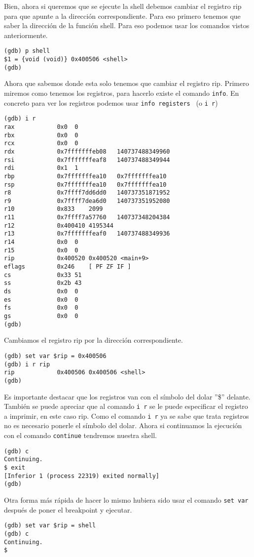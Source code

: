 Bien, ahora si queremos que se ejecute la shell debemos cambiar el registro rip para que apunte a la dirección correspondiente. Para eso primero tenemos que saber la dirección de la función shell. Para eso podemos usar los comandos vistos anteriormente.
\begin{verbatim}
(gdb) p shell
$1 = {void (void)} 0x400506 <shell>
(gdb)
\end{verbatim}
Ahora que sabemos donde esta solo tenemos que cambiar el registro rip. Primero miremos como tenemos los registros, para hacerlo existe el comando \texttt{info}. En concreto para ver los registros podemos usar \texttt{info registers } (o \texttt{i r})
\begin{verbatim}
(gdb) i r
rax            0x0	0
rbx            0x0	0
rcx            0x0	0
rdx            0x7fffffffeb08	140737488349960
rsi            0x7fffffffeaf8	140737488349944
rdi            0x1	1
rbp            0x7fffffffea10	0x7fffffffea10
rsp            0x7fffffffea10	0x7fffffffea10
r8             0x7ffff7dd6dd0	140737351871952
r9             0x7ffff7dea6d0	140737351952080
r10            0x833	2099
r11            0x7ffff7a57760	140737348204384
r12            0x400410	4195344
r13            0x7fffffffeaf0	140737488349936
r14            0x0	0
r15            0x0	0
rip            0x400520	0x400520 <main+9>
eflags         0x246	[ PF ZF IF ]
cs             0x33	51
ss             0x2b	43
ds             0x0	0
es             0x0	0
fs             0x0	0
gs             0x0	0
(gdb)
\end{verbatim}
Cambiamos el registro rip por la dirección correspondiente.
\begin{verbatim}
(gdb) set var $rip = 0x400506
(gdb) i r rip
rip            0x400506	0x400506 <shell>
(gdb)
\end{verbatim}
Es importante destacar que los registros van con el símbolo del dolar ''\$'' delante. También se puede apreciar que al comando \texttt{i r} se le puede especificar el registro a imprimir, en este caso rip. Como el comando \texttt{i r} ya se sabe que trata registros no es necesario ponerle el símbolo del dolar. Ahora si continuamos la ejecución con el comando \texttt{continue} tendremos nuestra shell.
\begin{verbatim}
(gdb) c
Continuing.
$ exit
[Inferior 1 (process 22319) exited normally]
(gdb)
\end{verbatim}

Otra forma más rápida de hacer lo mismo hubiera sido usar el comando \texttt{set var} después de poner el breakpoint y ejecutar.
\begin{verbatim}
(gdb) set var $rip = shell
(gdb) c
Continuing.
$
\end{verbatim}


